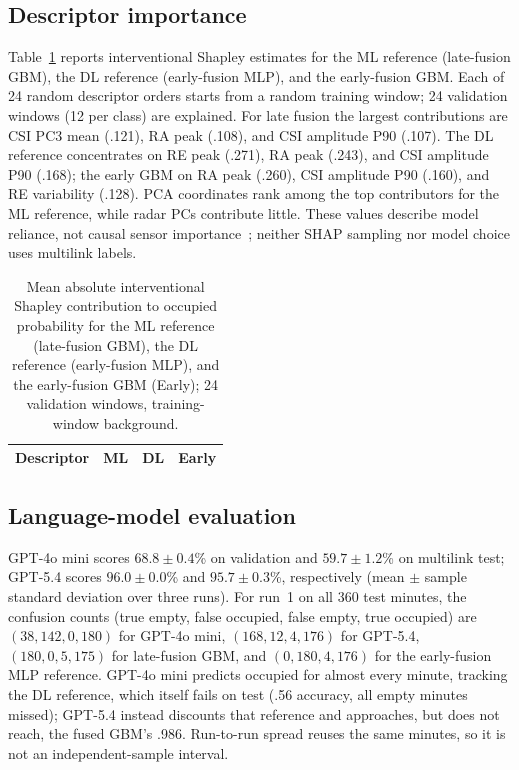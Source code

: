 \documentclass[conference,10pt,letterpaper]{IEEEtran}
\begin{document}
\subsection{Descriptor importance}
Table~\ref{tab:shap} reports interventional Shapley estimates for the ML reference (late-fusion GBM), the DL reference (early-fusion MLP), and the early-fusion GBM. Each of 24 random descriptor orders starts from a random training window; 24 validation windows (12 per class) are explained. For late fusion the largest contributions are CSI PC3 mean (.121), RA peak (.108), and CSI amplitude P90 (.107). The DL reference concentrates on RE peak (.271), RA peak (.243), and CSI amplitude P90 (.168); the early GBM on RA peak (.260), CSI amplitude P90 (.160), and RE variability (.128). PCA coordinates rank among the top contributors for the ML reference, while radar PCs contribute little. These values describe model reliance, not causal sensor importance~\cite{shap}; neither SHAP sampling nor model choice uses multilink labels.

\begin{table}[!t]
\centering\scriptsize\setlength{\tabcolsep}{5pt}
\caption{Mean absolute interventional Shapley contribution to occupied probability for the ML reference (late-fusion GBM), the DL reference (early-fusion MLP), and the early-fusion GBM (Early); 24 validation windows, training-window background.}
\label{tab:shap}
\begin{tabular}{@{}llll@{}}
\toprule
Descriptor & ML & DL & Early\\
\midrule

\end{tabular}
\end{table}

\subsection{Language-model evaluation}
GPT-4o mini scores $68.8\pm0.4$\% on validation and $59.7\pm1.2$\% on multilink test; GPT-5.4 scores $96.0\pm0.0$\% and $95.7\pm0.3$\%, respectively (mean $\pm$ sample standard deviation over three runs). For run~1 on all 360 test minutes, the confusion counts (true empty, false occupied, false empty, true occupied) are $(38,142,0,180)$ for GPT-4o mini, $(168,12,4,176)$ for GPT-5.4, $(180,0,5,175)$ for late-fusion GBM, and $(0,180,4,176)$ for the early-fusion MLP reference. GPT-4o mini predicts occupied for almost every minute, tracking the DL reference, which itself fails on test (.56 accuracy, all empty minutes missed); GPT-5.4 instead discounts that reference and approaches, but does not reach, the fused GBM's .986. Run-to-run spread reuses the same minutes, so it is not an independent-sample interval.
\end{document}
